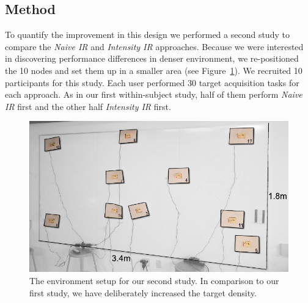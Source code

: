 \subsection{Method}
To quantify the improvement in this design we performed a second study to compare the {\em Naive IR} and {\em Intensity IR} approaches. Because we were interested in discovering performance differences in denser environment, we re-positioned the 10 nodes and set them up in a smaller area (see Figure~\ref{fig:study-layout2}). We recruited 10 participants for this study. Each  user performed 30 target acquisition tasks for each approach.  As in our first within-subject study, half of them perform {\em Naive IR} first and the other half {\em Intensity IR} first.

\begin{figure}[t]
\centering
\includegraphics[width=1.0\columnwidth]{figures/study-layout2.pdf}
\caption{The environment setup for our second study. In comparison to our first study, we have deliberately increased the target density.}
\label{fig:study-layout2}
\end{figure}








